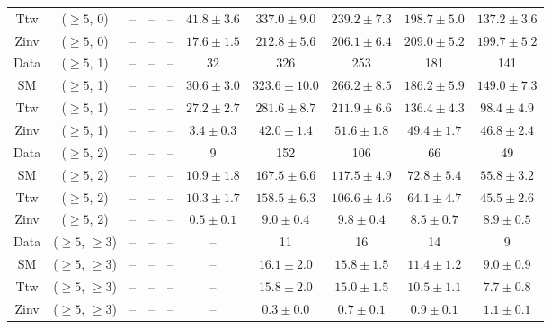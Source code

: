 \begin{table}[h!]
{\begin{tabular}{cccccccccc}
	Ttw & ($\ge5$, 0) & -- & -- & -- & $41.8\pm 3.6$ & $337.0\pm 9.0$ & $239.2\pm 7.3$ & $198.7\pm 5.0$ & $137.2\pm 3.6$ \\[0.5ex] 
	Zinv & ($\ge5$, 0) & -- & -- & -- & $17.6\pm 1.5$ & $212.8\pm 5.6$ & $206.1\pm 6.4$ & $209.0\pm 5.2$ & $199.7\pm 5.2$ \\[0.5ex] 
	Data & ($\ge5$, 1) & -- & -- & -- & 32 & 326 & 253 & 181 & 141 \\[0.5ex] 
	SM & ($\ge5$, 1) & -- & -- & -- & $30.6\pm 3.0$ & $323.6\pm 10.0$ & $266.2\pm 8.5$ & $186.2\pm 5.9$ & $149.0\pm 7.3$ \\[0.5ex] 
	Ttw & ($\ge5$, 1) & -- & -- & -- & $27.2\pm 2.7$ & $281.6\pm 8.7$ & $211.9\pm 6.6$ & $136.4\pm 4.3$ & $98.4\pm 4.9$ \\[0.5ex] 
	Zinv & ($\ge5$, 1) & -- & -- & -- & $3.4\pm 0.3$ & $42.0\pm 1.4$ & $51.6\pm 1.8$ & $49.4\pm 1.7$ & $46.8\pm 2.4$ \\[0.5ex] 
	Data & ($\ge5$, 2) & -- & -- & -- & 9 & 152 & 106 & 66 & 49 \\[0.5ex] 
	SM & ($\ge5$, 2) & -- & -- & -- & $10.9\pm 1.8$ & $167.5\pm 6.6$ & $117.5\pm 4.9$ & $72.8\pm 5.4$ & $55.8\pm 3.2$ \\[0.5ex] 
	Ttw & ($\ge5$, 2) & -- & -- & -- & $10.3\pm 1.7$ & $158.5\pm 6.3$ & $106.6\pm 4.6$ & $64.1\pm 4.7$ & $45.5\pm 2.6$ \\[0.5ex] 
	Zinv & ($\ge5$, 2) & -- & -- & -- & $0.5\pm 0.1$ & $9.0\pm 0.4$ & $9.8\pm 0.4$ & $8.5\pm 0.7$ & $8.9\pm 0.5$ \\[0.5ex] 
	Data & ($\ge5$, $\ge3$) & -- & -- & -- & -- & 11 & 16 & 14 & 9 \\[0.5ex] 
	SM & ($\ge5$, $\ge3$) & -- & -- & -- & -- & $16.1\pm 2.0$ & $15.8\pm 1.5$ & $11.4\pm 1.2$ & $9.0\pm 0.9$ \\[0.5ex] 
	Ttw & ($\ge5$, $\ge3$) & -- & -- & -- & -- & $15.8\pm 2.0$ & $15.0\pm 1.5$ & $10.5\pm 1.1$ & $7.7\pm 0.8$ \\[0.5ex] 
	Zinv & ($\ge5$, $\ge3$) & -- & -- & -- & -- & $0.3\pm 0.0$ & $0.7\pm 0.1$ & $0.9\pm 0.1$ & $1.1\pm 0.1$ \\[0.5ex] 
	\hline
	\hline
\end{tabular}}
\end{table}
